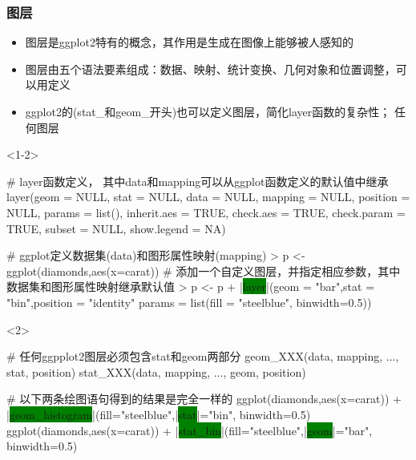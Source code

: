 \subsubsection{图层}
\begin{frame}[t,fragile]{\subsecname}{\subsubsecname}
\begin{itemize}
\item<1-> 图层是ggplot2特有的概念，其作用是生成在图像上能够被人感知的
\item<1-> 图层由五个语法要素组成：数据、映射、统计变换、几何对象和位置调整，可以用定义
\item<2-> ggplot2的(stat\_和geom\_开头)也可以定义图层，简化layer函数的复杂性；
任何图层
\end{itemize}

\begin{overlayarea}{\textwidth}{\textheight}
\begin{onlyenv}<1-2>
\begin{rcode}
# layer函数定义， 其中data和mapping可以从ggplot函数定义的默认值中继承
layer(geom = NULL, stat = NULL, data = NULL, mapping = NULL,
  position = NULL, params = list(), inherit.aes = TRUE,
  check.aes = TRUE, check.param = TRUE, subset = NULL, show.legend = NA)

# ggplot定义数据集(data)和图形属性映射(mapping)
> p <- ggplot(diamonds,aes(x=carat))
# 添加一个自定义图层，并指定相应参数，其中数据集和图形属性映射继承默认值
> p <- p + |\colorbox{green}{layer}|(geom = "bar",stat = "bin",position = "identity"
    params = list(fill = "steelblue", binwidth=0.5))
\end{rcode}
\end{onlyenv}

\begin{onlyenv}<2>
\begin{rcode}
# 任何ggpplot2图层必须包含stat和geom两部分
geom_XXX(data, mapping, ..., stat, position)
stat_XXX(data, mapping, ..., geom, position)

# 以下两条绘图语句得到的结果是完全一样的
ggplot(diamonds,aes(x=carat)) + |\colorbox{green}{geom\_histogram}|(fill="steelblue",|\colorbox{green}{stat}|="bin", binwidth=0.5)
ggplot(diamonds,aes(x=carat)) + |\colorbox{green}{stat\_bin}|(fill="steelblue",|\colorbox{green}{geom}|="bar", binwidth=0.5)
\end{rcode} 
\end{onlyenv}
\end{overlayarea}
\end{frame}


